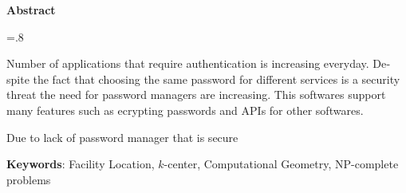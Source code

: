 


\pagestyle{empty}

\begin{latin}

\begin{center}
\textbf{Abstract}
\end{center}
\baselineskip=.8\baselineskip

Number of applications that require authentication is increasing everyday. Despite the fact that choosing the same password for different services is a security threat the need for password managers are increasing. This softwares support many features such as ecrypting passwords and APIs for other softwares.

Due to lack of password manager that is secure 

\bigskip\noindent\textbf{Keywords}:
Facility Location, $k$-center, Computational Geometry, NP-complete problems

\end{latin}

\newpage
